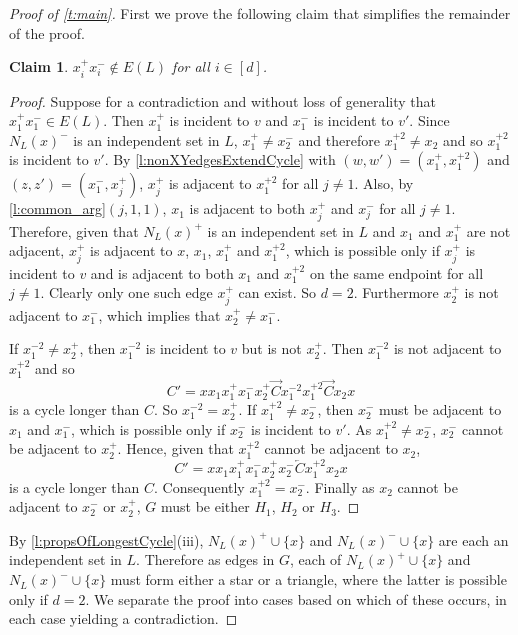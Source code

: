 \documentclass[12pt]{article}
\newtheorem{claim}{Claim}
\theoremstyle{definition}
\newcommand{\ola}{\overleftarrow{C}}
\newcommand{\ora}{\overrightarrow{C}}
\begin{document}
\begin{proof}[Proof of \cref{t:main}]
First we prove the following claim that simplifies the remainder of the proof.
\begin{claim}\label{cl:xi+xi-}
$x_i^+x_i^- \notin E(L)$ for all $i \in [d]$.
\end{claim}
\begin{proof}
Suppose for a contradiction and without loss of generality that $x_1^+x_1^- \in E(L)$. Then $x_1^+$ is incident to $v$ and $x_1^-$ is incident to $v'$. Since $N_L(x)^-$ is an independent set in $L$, $x_1^+ \neq x_{2}^-$ and therefore $x_1^{+2} \neq x_{2}$ and so $x_1^{+2}$ is incident to $v'$.
By \cref{l:nonXYedgesExtendCycle} with $(w,w')=(x_1^+,x_1^{+2})$ and 
$(z,z')=(x_1^-,x_j^+)$, $x_j^+$ is adjacent to $x_1^{+2}$ for all $j \neq 1$.
Also, by \cref{l:common_arg}$(j,1,1)$, $x_1$ is adjacent to both $x_j^+$ and $x_j^-$ for all $j \neq 1$. 
Therefore, given that $N_L(x)^+$ is an independent set in $L$ and $x_1$ and $x_1^+$ are not adjacent, $x_j^+$ is adjacent to $x$, $x_1$, $x_1^+$ and $x_1^{+2}$, which is possible only if $x_j^+$ is incident to $v$ and is adjacent to both $x_1$ and $x_1^{+2}$ on the same endpoint for all $j\neq 1$. Clearly only one such edge $x_j^+$ can exist. So $d=2$.
Furthermore
$x_{2}^+$ is not adjacent to $x_1^-$, which implies that $x_2^{+}\neq x_{1}^-$.

If $x_1^{-2} \neq x_{2}^+$, then $x_1^{-2}$ is incident to $v$ but is not $x_{2}^+$.
Then $x_1^{-2}$ is not adjacent to $x_1^{+2}$ and so 
\[
C' = xx_1 x_1^+ x_1^- x_{2}^+ \ora x_1^{-2} x_1^{+2} \ora x_2 x 
\]
is a cycle longer than $C$. So $x_1^{-2} = x_{2}^+$.
If $x_1^{+2} \neq x_2^-$, then $x_2^-$ must be adjacent to $x_1$ and $x_1^-$, which is possible only if $x_2^-$ is incident to $v'$. As $x_1^{+2} \neq x_2^-$, $x_2^-$ cannot be adjacent to $x_2^+$. Hence, given that $x_1^{+2}$ cannot be adjacent to $x_2$, 
\[
C' = x x_1 x_1^+ x_1^- x_2^+ x_2^- \ola x_1^{+2} x_2 x
\]
is a cycle longer than $C$. Consequently $ x_1^{+2} = x_2^-$.
Finally as $x_2$ cannot be adjacent to $x_2^-$ or $x_2^+$, $G$ must be either $H_1$, $H_2$ or $H_3$.
\end{proof}
By \cref{l:propsOfLongestCycle}(iii), $N_L(x)^+\cup \{x\}$ and $N_L(x)^-\cup \{x\}$ are each an independent set in $L$. Therefore as edges in $G$, each of $N_L(x)^+ \cup \{x\}$ and $N_L(x)^- \cup \{x\}$ must form either a star or a triangle, where the latter is possible only if $d=2$.
We separate the proof into cases based on which of these occurs, in each case yielding a contradiction.


\end{proof}
\end{document}
